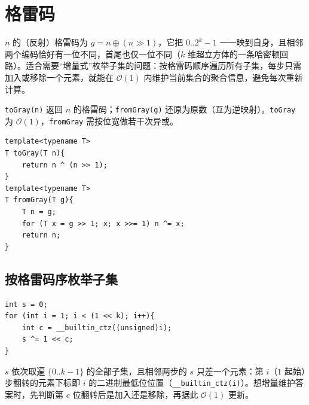 \section{格雷码}

$n$ 的（反射）格雷码为 $g=n\oplus(n\gg1)$，它把 $0..2^k-1$ 一一映到自身，且相邻两个编码恰好有一位不同，首尾也仅一位不同（$k$ 维超立方体的一条哈密顿回路）。适合需要“增量式”枚举子集的问题：按格雷码顺序遍历所有子集，每步只需加入或移除一个元素，就能在 $\mathcal{O}(1)$ 内维护当前集合的聚合信息，避免每次重新计算。

\verb|toGray(n)| 返回 $n$ 的格雷码；\verb|fromGray(g)| 还原为原数（互为逆映射）。\verb|toGray| 为 $\mathcal{O}(1)$，\verb|fromGray| 需按位宽做若干次异或。

\begin{lstlisting}
template<typename T>
T toGray(T n){
    return n ^ (n >> 1);
}
template<typename T>
T fromGray(T g){
    T n = g;
    for (T x = g >> 1; x; x >>= 1) n ^= x;
    return n;
}
\end{lstlisting}

\subsection{按格雷码序枚举子集}

\begin{lstlisting}
int s = 0;
for (int i = 1; i < (1 << k); i++){
    int c = __builtin_ctz((unsigned)i);
    s ^= 1 << c;
}
\end{lstlisting}

$s$ 依次取遍 $\{0..k-1\}$ 的全部子集，且相邻两步的 $s$ 只差一个元素：第 $i$（$1$ 起始）步翻转的元素下标即 $i$ 的二进制最低位位置（\verb|__builtin_ctz(i)|）。想增量维护答案时，先判断第 $c$ 位翻转后是加入还是移除，再据此 $\mathcal{O}(1)$ 更新。
